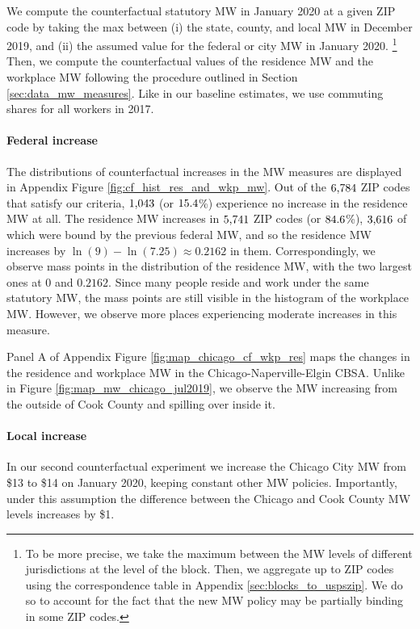 We compute the counterfactual statutory MW in January 2020 at a given ZIP code 
by taking the max between (i) the state, county, and local MW in December 2019, 
and (ii) the assumed value for the federal or city MW in January 2020.%
\footnote{To be more precise, we take the maximum between the MW levels of 
different jurisdictions at the level of the block.
Then, we aggregate up to ZIP codes using the correspondence table in Appendix 
\ref{sec:blocks_to_uspszip}.
We do so to account for the fact that the new MW policy may be partially 
binding in some ZIP codes.}
Then, we compute the counterfactual values of the residence MW and the workplace
MW following the procedure outlined in Section \ref{sec:data_mw_measures}.
Like in our baseline estimates, we use commuting shares for all workers in 2017.

\paragraph{Federal increase}

The distributions of counterfactual increases in the MW measures are displayed 
in Appendix Figure \ref{fig:cf_hist_res_and_wkp_mw}.
Out of the $\textnormal{6,784}$ ZIP codes that satisfy our criteria, 
$\textnormal{1,043}$ (or $\textnormal{15.4}$\%) experience no increase in 
the residence MW at all.
The residence MW increases in $\textnormal{5,741}$ ZIP codes  (or $\textnormal{84.6}$\%), 
$\textnormal{3,616}$ of which were bound by the previous federal MW, and 
so the residence MW increases by $\ln(9)-\ln(7.25)\approx 0.2162$ in them.
Correspondingly, we observe mass points in the distribution of the residence MW,
with the two largest ones at $0$ and $0.2162$.
Since many people reside and work under the same statutory MW, the mass points 
are still visible in the histogram of the workplace MW.
However, we observe more places experiencing moderate increases in this measure.

Panel A of Appendix Figure \ref{fig:map_chicago_cf_wkp_res} maps the changes 
in the residence and workplace MW in the Chicago-Naperville-Elgin CBSA.
Unlike in Figure \ref{fig:map_mw_chicago_jul2019}, we observe the MW increasing 
from the outside of Cook County and spilling over inside it.

\paragraph{Local increase}

In our second counterfactual experiment we increase the Chicago City MW 
from \$13 to \$14 on January 2020, keeping constant other MW policies.
Importantly, under this assumption the difference between the Chicago
and Cook County MW levels increases by \$1.

